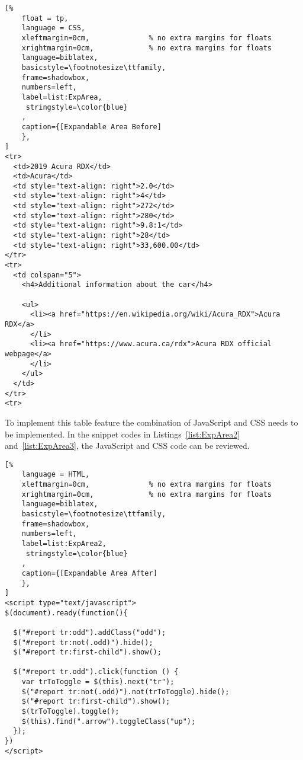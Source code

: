 \begin{lstlisting}[%
    float = tp,
    language = CSS,
    xleftmargin=0cm,              % no extra margins for floats
    xrightmargin=0cm,             % no extra margins for floats
    language=biblatex,
    basicstyle=\footnotesize\ttfamily,
    frame=shadowbox,
    numbers=left,
    label=list:ExpArea,
     stringstyle=\color{blue}
    ,
    caption={[Expandable Area Before]
    },
]
<tr>
  <td>2019 Acura RDX</td>
  <td>Acura</td>
  <td style="text-align: right">2.0</td>
  <td style="text-align: right">4</td>
  <td style="text-align: right">272</td>
  <td style="text-align: right">280</td>
  <td style="text-align: right">9.8:1</td>
  <td style="text-align: right">28</td>
  <td style="text-align: right">33,600.00</td>
</tr>
<tr>
  <td colspan="5">
    <h4>Additional information about the car</h4>

    <ul>
      <li><a href="https://en.wikipedia.org/wiki/Acura_RDX">Acura RDX</a>
      </li>
      <li><a href="https://www.acura.ca/rdx">Acura RDX official webpage</a>
      </li>
    </ul>
  </td>
</tr>
<tr>
\end{lstlisting}
To implement this table feature the combination of JavaScript and CSS
needs to be implemented. In the snippet codes in Listings~\ref{list:ExpArea2} and~\ref{list:ExpArea3}, the JavaScript and
CSS code can be reviewed.

\begin{lstlisting}[%
    language = HTML,
    xleftmargin=0cm,              % no extra margins for floats
    xrightmargin=0cm,             % no extra margins for floats
    language=biblatex,
    basicstyle=\footnotesize\ttfamily,
    frame=shadowbox,
    numbers=left,
    label=list:ExpArea2,
     stringstyle=\color{blue}
    ,
    caption={[Expandable Area After]
    },
]
<script type="text/javascript">
$(document).ready(function(){

  $("#report tr:odd").addClass("odd");
  $("#report tr:not(.odd)").hide();
  $("#report tr:first-child").show();

  $("#report tr.odd").click(function () {
    var trToToggle = $(this).next("tr");
    $("#report tr:not(.odd)").not(trToToggle).hide();
    $("#report tr:first-child").show();
    $(trToToggle).toggle();
    $(this).find(".arrow").toggleClass("up");
  });
})
</script>

\end{lstlisting}

